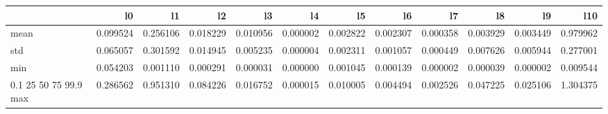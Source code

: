 \begin{tabular}{lrrrrrrrrrrr}
\toprule
 & l0 & l1 & l2 & l3 & l4 & l5 & l6 & l7 & l8 & l9 & l10 \\
\midrule
mean & 0.099524 & 0.256106 & 0.018229 & 0.010956 & 0.000002 & 0.002822 & 0.002307 & 0.000358 & 0.003929 & 0.003449 & 0.979962 \\
std & 0.065057 & 0.301592 & 0.014945 & 0.005235 & 0.000004 & 0.002311 & 0.001057 & 0.000449 & 0.007626 & 0.005944 & 0.277001 \\
min & 0.054203 & 0.001110 & 0.000291 & 0.000031 & 0.000000 & 0.001045 & 0.000139 & 0.000002 & 0.000039 & 0.000002 & 0.009544 \\
0.1%
25%
50%
75%
99.9%
max & 0.286562 & 0.951310 & 0.084226 & 0.016752 & 0.000015 & 0.010005 & 0.004494 & 0.002526 & 0.047225 & 0.025106 & 1.304375 \\
\bottomrule
\end{tabular}
